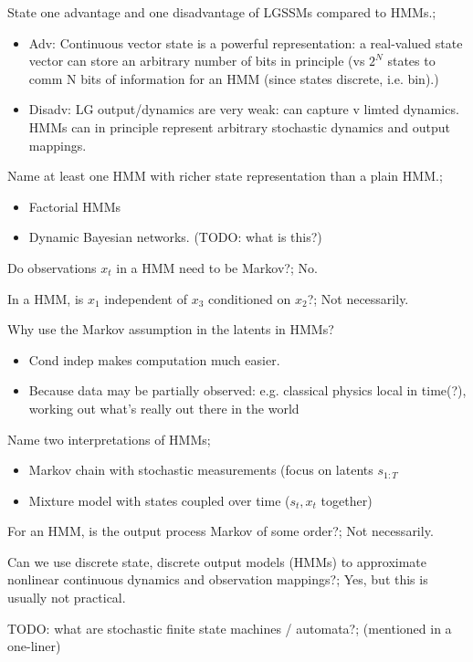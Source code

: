\documentclass{article}
\begin{document}
State one advantage and one disadvantage of LGSSMs compared to HMMs.; \begin{itemize}
    \item Adv: Continuous vector state is a powerful representation: a real-valued state vector can store an arbitrary number of bits in principle (vs $2^N$ states to comm N bits of information for an HMM (since states discrete, i.e. bin).)
    \item Disadv: LG output/dynamics are very weak: can capture v limted dynamics. HMMs can in principle represent arbitrary stochastic dynamics and output mappings.
\end{itemize}

Name at least one HMM with richer state representation than a plain HMM.; \begin{itemize}
    \item Factorial HMMs
    \item Dynamic Bayesian networks. (TODO: what is this?)
\end{itemize}

Do observations $x_t$ in a HMM need to be Markov?; No.

In a HMM, is $x_1$ independent of $x_3$ conditioned on $x_2$?; Not necessarily.

Why use the Markov assumption in the latents in HMMs? \begin{itemize}
    \item Cond indep makes computation much easier.
    \item Because data may be partially observed: e.g. classical physics local in time(?), working out what's really out there in the world
\end{itemize}

Name two interpretations of HMMs; \begin{itemize}
    \item Markov chain with stochastic measurements (focus on latents $s_{1:T}$
    \item Mixture model with states coupled over time ($s_t, x_t$ together)
\end{itemize}

For an HMM, is the output process Markov of some order?; Not necessarily.

Can we use discrete state, discrete output models (HMMs) to approximate nonlinear continuous dynamics and observation mappings?; Yes, but this is usually not practical. 

TODO: what are stochastic finite state machines / automata?; (mentioned in a one-liner)
\end{document}
